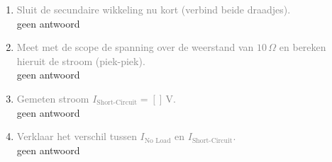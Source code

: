 \begin{enumerate}
    \item \textcolor{gray}{Sluit de secundaire wikkeling nu kort (verbind beide draadjes).}
    \\ geen antwoord
    
    \item \textcolor{gray}{Meet met de scope de spanning over de weerstand van \(10 \, \Omega\) en bereken hieruit de stroom (piek-piek).}
    \\ geen antwoord
    
    \item \textcolor{gray}{Gemeten stroom \( I_{\text{Short-Circuit}} = [ ] \, \text{V} \).}
    \\ geen antwoord
    
    \item \textcolor{gray}{Verklaar het verschil tussen \( I_{\text{No Load}} \) en \( I_{\text{Short-Circuit}} \).}
    \\ geen antwoord
\end{enumerate}
